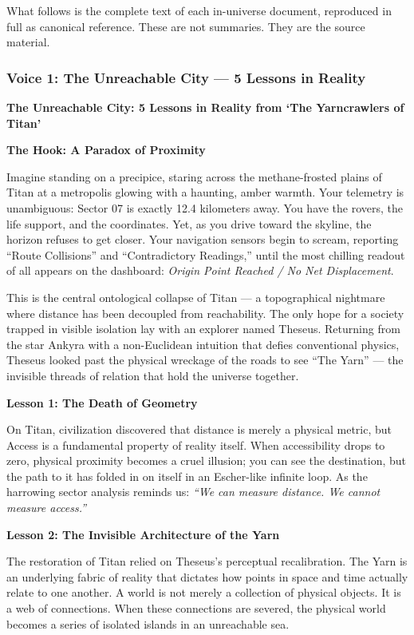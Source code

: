 \documentclass[11pt]{article}
\begin{document}
What follows is the complete text of each in-universe document, reproduced in full as canonical reference. These are not summaries. They are the source material.

\subsubsection{Voice 1: The Unreachable City --- 5 Lessons in Reality}

\begin{archivebox}
\textcolor{archiveGold}{\textbf{The Unreachable City: 5 Lessons in Reality from `The Yarncrawlers of Titan'}}\\[6pt]
\small

\textbf{The Hook: A Paradox of Proximity}

Imagine standing on a precipice, staring across the methane-frosted plains of Titan at a metropolis glowing with a haunting, amber warmth. Your telemetry is unambiguous: Sector 07 is exactly 12.4 kilometers away. You have the rovers, the life support, and the coordinates. Yet, as you drive toward the skyline, the horizon refuses to get closer. Your navigation sensors begin to scream, reporting ``Route Collisions'' and ``Contradictory Readings,'' until the most chilling readout of all appears on the dashboard: \textit{Origin Point Reached / No Net Displacement}.

This is the central ontological collapse of Titan --- a topographical nightmare where distance has been decoupled from reachability. The only hope for a society trapped in visible isolation lay with an explorer named Theseus. Returning from the star Ankyra with a non-Euclidean intuition that defies conventional physics, Theseus looked past the physical wreckage of the roads to see ``The Yarn'' --- the invisible threads of relation that hold the universe together.

\textbf{Lesson 1: The Death of Geometry}

On Titan, civilization discovered that distance is merely a physical metric, but Access is a fundamental property of reality itself. When accessibility drops to zero, physical proximity becomes a cruel illusion; you can see the destination, but the path to it has folded in on itself in an Escher-like infinite loop. As the harrowing sector analysis reminds us: \textit{``We can measure distance. We cannot measure access.''}

\textbf{Lesson 2: The Invisible Architecture of the Yarn}

The restoration of Titan relied on Theseus's perceptual recalibration. The Yarn is an underlying fabric of reality that dictates how points in space and time actually relate to one another. A world is not merely a collection of physical objects. It is a web of connections. When these connections are severed, the physical world becomes a series of isolated islands in an unreachable sea.


\end{archivebox}
\end{document}
